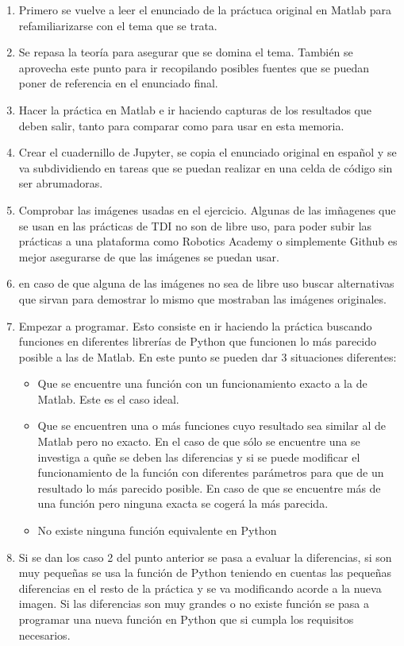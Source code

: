 \begin{enumerate}
    \item Primero se vuelve a leer el enunciado de la práctuca original en Matlab para refamiliarizarse con el tema que se trata.
    \item Se repasa la teoría para asegurar que se domina el tema. También se aprovecha este punto para ir recopilando posibles fuentes que se puedan poner de referencia en el enunciado final.
    \item Hacer la práctica en Matlab e ir haciendo capturas de los resultados que deben salir, tanto para comparar como para usar en esta memoria.
    \item Crear el cuadernillo de Jupyter, se copia el enunciado original en español y se va subdividiendo en tareas que se puedan realizar en una celda de código sin ser abrumadoras.
    \item Comprobar las imágenes usadas en el ejercicio. Algunas de las imñagenes que se usan en las prácticas de TDI no son de libre uso, para poder subir las prácticas a una plataforma como Robotics Academy o simplemente Github es mejor asegurarse de que las imágenes se puedan usar.
    \item en caso de que alguna de las imágenes no sea de libre uso buscar alternativas que sirvan para demostrar lo mismo que mostraban las imágenes originales.
    \item Empezar a programar. Esto consiste en ir haciendo la práctica buscando funciones en diferentes librerías de Python que funcionen lo más parecido posible a las de Matlab. En este punto se pueden dar 3 situaciones diferentes:
        \begin{itemize}
            \item Que se encuentre una función con un funcionamiento exacto a la de Matlab. Este es el caso ideal.
            \item Que se encuentren una o más funciones cuyo resultado sea similar al de Matlab pero no exacto. En el caso de que sólo se encuentre una se investiga a quñe se deben las diferencias y si se puede modificar el funcionamiento de la función con diferentes parámetros para que de un resultado lo más parecido posible. En caso de que se encuentre más de una función pero ninguna exacta se cogerá la más parecida.
            \item  No existe ninguna función equivalente en Python
        \end{itemize}
    \item Si se dan los caso 2 del punto anterior se pasa a evaluar la diferencias, si son muy pequeñas se usa la función de Python teniendo en cuentas las pequeñas diferencias en el resto de la práctica y se va modificando acorde a la nueva imagen. Si las diferencias son muy grandes o no existe función se pasa a programar una nueva función en Python que si cumpla los requisitos necesarios.

\end{enumerate}
